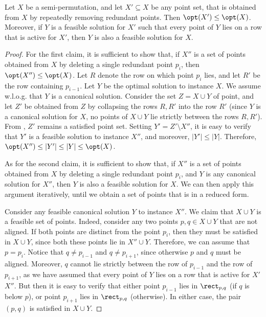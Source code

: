 \begin{lemma}\label{lem: reduced point set} 
	Let $X$ be a semi-permutation, and let $X' \subseteq X$ be any point set, that is obtained from $X$ by repeatedly removing redundant points.  Then $\opt(X')\leq \opt(X)$. Moreover, if $Y$ is a feasible solution for $X'$ such that every point of $Y$ lies on a row that is active for $X'$, then $Y$ is also a feasible solution for $X$.
\end{lemma}
\begin{proof}
For the first claim, it is sufficient to show that, if $X''$ is a set of points obtained from $X$ by deleting a single redundant point $p_i$, then $\opt(X'')\leq \opt(X)$. Let $R$ denote the row on which point $p_i$ lies, and let $R'$ be the row containing $p_{i-1}$. Let $Y$ be the optimal solution to instance $X$. We assume w.l.o.g. that $Y$ is a canonical solution. Consider the set $Z=X\cup Y$ of point, and let $Z'$ be obtained from $Z$ by collapsing the rows $R,R'$ into the row $R'$ (since $Y$ is a canonical solution for $X$, no points of $X\cup Y$ lie strictly between the rows $R,R'$). From , $Z'$ remains a satisfied point set. Setting $Y'=Z'\setminus X''$, it is easy to verify that $Y'$ is a feasible solution to instance $X''$, and moreover, $|Y'|\leq |Y|$. Therefore, $\opt(X'')\leq |Y'|\leq |Y|\leq \opt(X)$.


As for the second claim, it is sufficient to show that, if $X''$ is a set of points obtained from $X$ by deleting a single redundant point $p_i$, and $Y$ is any canonical solution for $X''$, then $Y$ is also a feasible solution for $X$. We can then apply this argument iteratively, until we obtain a set of points that is in a reduced form.
	
	Consider any feasible canonical solution $Y$ to instance $X''$. We claim that $X \cup Y$ is a feasible set of points. Indeed,
	consider any two points $p,q \in X \cup Y$ that are not aligned. If both points are distinct from the point $p_i$, then they must be satisfied in $X\cup Y$, since both these points lie in $X''\cup Y$. Therefore, we can assume that $p=p_i$. Notice that $q \neq p_{i-1}$ and  $q \neq p_{i+1}$, since otherwise $p$ and $q$ must be aligned. Moreover, $q$ cannot lie strictly between the row of $p_{i-1}$ and the row of $p_{i+1}$, as we have assumed that every point of $Y$ lies on a row that is active for $X'$ $X''$. But then it is easy to verify that either point $p_{i-1}$ lies in $\rect_{p,q}$ (if $q$ is below $p$), or point $p_{i+1}$ lies in $\rect_{p,q}$ (otherwise). In either case, the pair $(p,q)$ is satisfied in $X\cup Y$.    
\end{proof}



